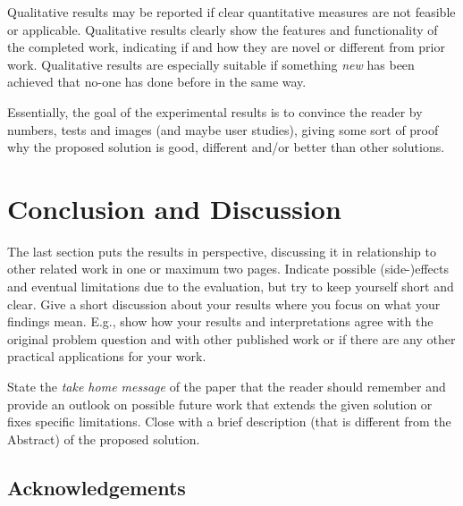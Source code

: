 \documentclass[11pt, a4paper,oneside,chapterprefix=false]{scrbook}
\begin{document}
Qualitative results may be reported if clear quantitative measures are not feasible or applicable. Qualitative results clearly show the features and functionality of the completed work, indicating if and how they are novel or different from prior work. Qualitative results are especially suitable if something \emph{new} has been achieved that no-one has done before in the same way.

Essentially, the goal of the experimental results is to convince the reader by numbers, tests and images (and maybe user studies), giving some sort of proof why the proposed solution is good, different and/or better than other solutions.




\chapter{Conclusion and Discussion} \label{chp:conclusion}

The last section puts the results in perspective, discussing it in relationship to other related work in one or maximum two pages. Indicate possible (side-)effects and eventual limitations due to the evaluation, but try to keep yourself short and clear. Give a short discussion about your results where you focus on what your findings mean. E.g., show how your results and interpretations agree with the original problem question and with other published work or if there are any other practical applications for your work.

State the \emph{take home message} of the paper that the reader should remember and provide an outlook on possible future work that extends the given solution or fixes specific limitations. Close with a brief description (that is different from the Abstract) of the proposed solution.

\section*{Acknowledgements}
\end{document}
